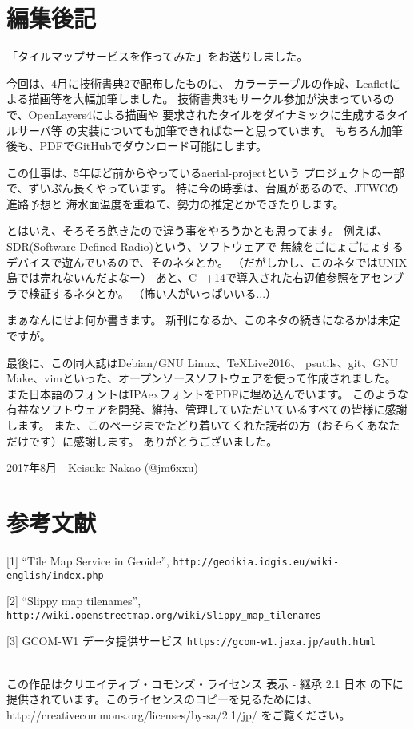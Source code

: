 \section*{編集後記}

「タイルマップサービスを作ってみた」をお送りしました。

今回は、4月に技術書典2で配布したものに、
カラーテーブルの作成、Leafletによる描画等を大幅加筆しました。
技術書典3もサークル参加が決まっているので、OpenLayers4による描画や
要求されたタイルをダイナミックに生成するタイルサーバ等
の実装についても加筆できればなーと思っています。
もちろん加筆後も、PDFでGitHubでダウンロード可能にします。

この仕事は、5年ほど前からやっているaerial-projectという
プロジェクトの一部で、ずいぶん長くやっています。
特に今の時季は、台風があるので、JTWCの進路予想と
海水面温度を重ねて、勢力の推定とかできたりします。

とはいえ、そろそろ飽きたので違う事をやろうかとも思ってます。
例えば、SDR(Software Defined Radio)という、ソフトウェアで
無線をごにょごにょするデバイスで遊んでいるので、そのネタとか。
（だがしかし、このネタではUNIX島では売れないんだよなー）
あと、C++14で導入された右辺値参照をアセンブラで検証するネタとか。
（怖い人がいっぱいいる...）

まぁなんにせよ何か書きます。
新刊になるか、このネタの続きになるかは未定ですが。


最後に、この同人誌はDebian/GNU Linux、\TeX Live2016、
psutils、git、GNU Make、vimといった、オープンソースソフトウェアを使って作成されました。
また日本語のフォントはIPAexフォントをPDFに埋め込んでいます。
このような有益なソフトウェアを開発、維持、管理していただいているすべての皆様に感謝します。
また、このページまでたどり着いてくれた読者の方（おそらくあなただけです）に感謝します。
ありがとうございました。

\begin{flushright}
2017年8月　Keisuke Nakao (@jm6xxu) 
\end{flushright}

\section*{参考文献}
         [1] ``Tile Map Service in Geoide'', \texttt{http://geoikia.idgis.eu/wiki-english/index.php}
       
       [2] ``Slippy map tilenames'', \texttt{http://wiki.openstreetmap.org/wiki/Slippy\_map\_tilenames}
       
[3] GCOM-W1 データ提供サービス \texttt{https://gcom-w1.jaxa.jp/auth.html}



\clearpage
\mbox{}
\clearpage
\mbox{}
\vspace{55em}\\
この作品はクリエイティブ・コモンズ・ライセンス 表示 - 継承 2.1 日本 の下に提供されています。このライセンスのコピーを見るためには、http://creativecommons.org/licenses/by-sa/2.1/jp/ をご覧ください。
